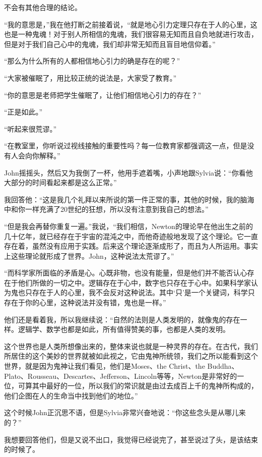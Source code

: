 \documentclass[UTF8]{article}
\begin{document}
\par 不会有其他合理的结论。
\par “我的意思是，”我在他打断之前接着说，“就是地心引力定理只存在于人的心里，这也是一种鬼魂！对于别人所相信的鬼魂，我们很容易无知而且自负地就进行攻击，但是对于我们自己心中的鬼魂，我们却非常无知而且盲目地信仰着。”
\par “那么为什么所有的人都相信地心引力的确是存在的呢？”
\par “大家被催眠了，用比较正统的说法是，大家受了教育。”
\par “你的意思是老师把学生催眠了，让他们相信地心引力的存在？”
\par “正是如此。”
\par “听起来很荒谬。”
\par “在教室里，你听说过视线接触的重要性吗？每一位教育家都强调这一点，但是没有人会向你解释。”
\par John摇摇头，然后又为我倒了一杯，他用手遮着嘴，小声地跟Sylvia说：“你看他大部分的时间看起来都是这么正常。”
\par 我回答他：“这是我几个礼拜以来所说的第一件正常的事，其他的时候，我的脑海中和你一样充满了20世纪的狂想，所以没有注意到我自己的想法。”
\par “但是我会再替你重复一遍。”我说，“我们相信，Newton的理论早在他出生之前的几十亿年，就已经存在于宇宙的混沌之中，而他奇迹般地发现了这个理论。它一直存在着，虽然没有应用于实践。后来这个理论逐渐成形了，而且为人所运用。事实上这些理论就形成了世界。John，这种说法太荒谬了。”
\par “而科学家所面临的矛盾是心。心既非物，也没有能量，但是他们并不能否认心存在于他们所做的一切之中。逻辑存在于心中，数字也只存在于心中。如果科学家认为鬼也只存在于人的心里，我不会反对这种说法。其中‘只’是一个关键词，科学只存在于你的心里，这种说法并没有错，鬼也是一样。”
\par 他们还是看着我，所以我继续说：“自然的法则是人类发明的，就像鬼的存在一样。逻辑学、数学也都是如此，所有值得赞美的事，也都是人类的发明。
\par 这个世界也是人类所想像出来的，整体来说也就是一种灵界的存在。在古代，我们所居住的这个美妙的世界就被如此视之，它由鬼神所统领，我们之所以能看到这个世界，就是因为鬼神让我们看见，他们是Moses、the Christ、the Buddha、Plato、Rousseau、Descartes、Jefferson、Lincoln等等，Newton是非常好的一位，可算其中最好的一位，所以我们的常识就是由过去成百上千的鬼神所构成的，他们企图在人的生命当中找到他们的地位。”
\par 这个时候John正沉思不语，但是Sylvia非常兴奋地说：“你这些念头是从哪儿来的？”
\par 我想要回答他们，但是又说不出口，我觉得已经说完了，甚至说过了头，是该结束的时候了。
\end{document}
